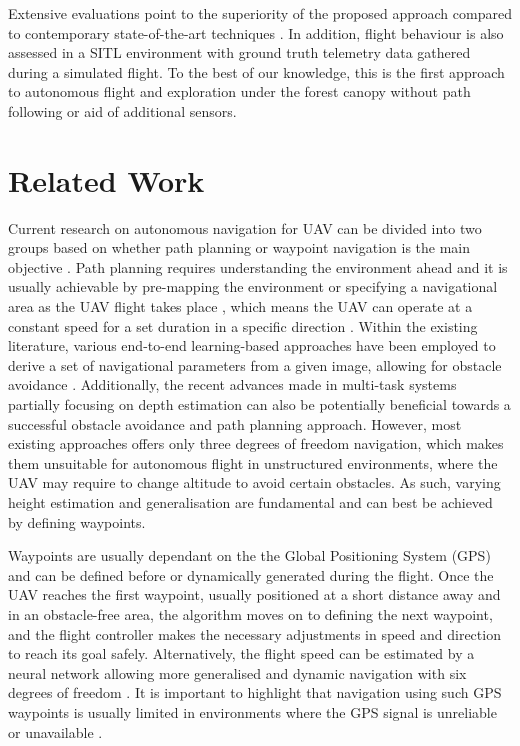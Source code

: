 \documentclass[letterpaper, 10 pt, journal, twoside]{IEEEtran}
\begin{document}
Extensive evaluations point to the superiority of the proposed approach compared to contemporary state-of-the-art techniques \cite{kendall2015posenet, wang2017deepvo, bojarski2016end}. In addition, flight behaviour is also assessed in a SITL environment with ground truth telemetry data gathered during a simulated flight. To the best of our knowledge, this is the first approach to autonomous flight and exploration under the forest canopy without path following or aid of additional sensors.     \section{Related Work}
Current research on autonomous navigation for UAV can be divided into two groups based on whether path planning or waypoint navigation is the main objective \cite{haralick1994review, Chiara2017Forestry}. 
Path planning requires understanding the environment ahead and it is usually achievable by pre-mapping the environment or specifying a navigational area as the UAV flight takes place \cite{Dey2014VisionFlight, Salami2014UAVAreas, Smolyanskiy2017TowardAwareness,kahn2017plato}, which means the UAV can operate at a constant speed for a set duration in a specific direction \cite{Maciel-Pearson2018ExtendingCanopyb,drews2017aggressive}. Within the existing literature, various end-to-end learning-based approaches have been employed to derive a set of navigational parameters from a given image, allowing for obstacle avoidance \cite{Smolyanskiy2017TowardAwareness,Dey2014VisionFlight,Maciel-Pearson2018ExtendingCanopyb,sadeghi2016cad2rl}. Additionally, the recent advances made in multi-task systems partially focusing on depth estimation \cite{zhou2017unsupervised, ummenhofer2017demon, yin2018geonet, atapour2019veritatem} can also be potentially beneficial towards a successful obstacle avoidance and path planning approach. However, most existing approaches offers only three degrees of freedom navigation, which makes them unsuitable for autonomous flight in unstructured environments, where the UAV may require to change altitude to avoid certain obstacles. As such, varying height estimation and generalisation are fundamental and can best be achieved by defining waypoints.

Waypoints are usually dependant on the the Global Positioning System (GPS) and can be defined before or dynamically generated during the flight. Once the UAV reaches the first waypoint, usually positioned at a short distance away and in an obstacle-free area, the algorithm moves on to defining the next waypoint, and the flight controller makes the necessary adjustments in speed and direction to reach its goal \cite{kaufmann2018deep, mohta2018fast} safely. Alternatively, the flight speed can be estimated by a neural network allowing more generalised and dynamic navigation with six degrees of freedom \cite{jung2018perception,kaufmann2018deep}.
It is important to highlight that navigation using such GPS waypoints is usually limited in environments where the GPS signal is unreliable or unavailable \cite{perez2018architecture}. 
 
\end{document}
